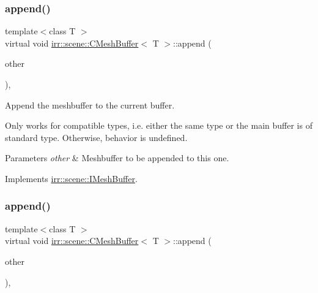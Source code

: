 \subsubsection{\texorpdfstring{append()}{append()}\hspace{0.1cm}{\footnotesize\ttfamily [3/4]}}
{\footnotesize\ttfamily template$<$class T $>$ \\
virtual void \hyperlink{classirr_1_1scene_1_1CMeshBuffer}{irr\+::scene\+::\+C\+Mesh\+Buffer}$<$ T $>$\+::append (\begin{DoxyParamCaption}\item[{const \hyperlink{classirr_1_1scene_1_1IMeshBuffer}{I\+Mesh\+Buffer} $\ast$const}]{other }\end{DoxyParamCaption})\hspace{0.3cm}{\ttfamily [inline]}, {\ttfamily [virtual]}}



Append the meshbuffer to the current buffer. 

Only works for compatible types, i.\+e. either the same type or the main buffer is of standard type. Otherwise, behavior is undefined. 
\begin{DoxyParams}{Parameters}
{\em other} & Meshbuffer to be appended to this one. \\
\hline
\end{DoxyParams}


Implements \hyperlink{classirr_1_1scene_1_1IMeshBuffer_a79d2737962579138183ed0fd324310b3}{irr\+::scene\+::\+I\+Mesh\+Buffer}.

\mbox{\label{classirr_1_1scene_1_1CMeshBuffer_af48b88e6c1bd79e6abd6a6803aa106c0}} 
\subsubsection{\texorpdfstring{append()}{append()}\hspace{0.1cm}{\footnotesize\ttfamily [4/4]}}
{\footnotesize\ttfamily template$<$class T $>$ \\
virtual void \hyperlink{classirr_1_1scene_1_1CMeshBuffer}{irr\+::scene\+::\+C\+Mesh\+Buffer}$<$ T $>$\+::append (\begin{DoxyParamCaption}\item[{const \hyperlink{classirr_1_1scene_1_1IMeshBuffer}{I\+Mesh\+Buffer} $\ast$const}]{other }\end{DoxyParamCaption})\hspace{0.3cm}{\ttfamily [inline]}, {\ttfamily [virtual]}}



